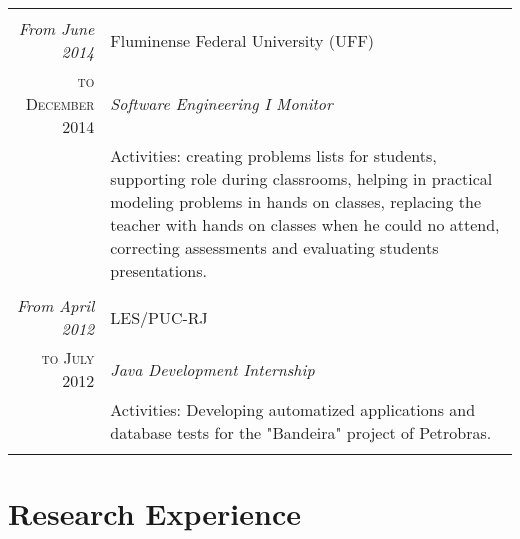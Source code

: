 \documentclass[a4paper,10pt]{article}
\begin{document}
\begin{tabular}{r|p{10.8cm}}
 & \\
 
 \emph{From June 2014} & Fluminense Federal University (UFF) \\
 \textsc{to December 2014}&\emph{Software Engineering I Monitor}\\
 &\footnotesize{Activities: creating problems lists for students, supporting role during classrooms, helping in practical modeling problems in hands on classes, replacing the teacher with hands on classes when he could no attend, correcting assessments and evaluating students presentations.}\\
 
  & \\
 
 \emph{From April 2012} & LES/PUC-RJ \\
 \textsc{to July 2012}&\emph{Java Development Internship}\\
 &\footnotesize{Activities: Developing automatized applications and database tests for the "Bandeira" project of Petrobras.}\\
 
 \multicolumn{2}{c}{} \end{tabular}
 
 \section{Research Experience}
 
\end{document}
